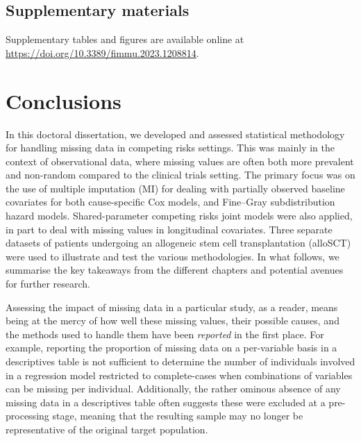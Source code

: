 \documentclass[
  letterpaper,
  paper=240mm:170mm,
  twoside=true,
  open=right,
  fontsize=10pt,
  pagesize=false,
  BCOR=15mm,
  DIV=14,
  headinclude=true,
  footinclude=false,
  headsepline=on]{scrbook}
\begin{document}
\section*{Supplementary materials}\label{supplementary-materials-5}


Supplementary tables and figures are available online at
\url{https://doi.org/10.3389/fimmu.2023.1208814}.


\chapter{Conclusions}\label{sec-chap-discussion}

In this doctoral dissertation, we developed and assessed statistical
methodology for handling missing data in competing risks settings. This
was mainly in the context of observational data, where missing values
are often both more prevalent and non-random compared to the clinical
trials setting. The primary focus was on the use of multiple imputation
(MI) for dealing with partially observed baseline covariates for both
cause-specific Cox models, and Fine--Gray subdistribution hazard models.
Shared-parameter competing risks joint models were also applied, in part
to deal with missing values in longitudinal covariates. Three separate
datasets of patients undergoing an allogeneic stem cell transplantation
(alloSCT) were used to illustrate and test the various methodologies. In
what follows, we summarise the key takeaways from the different chapters
and potential avenues for further research.

Assessing the impact of missing data in a particular study, as a reader,
means being at the mercy of how well these missing values, their
possible causes, and the methods used to handle them have been
\emph{reported} in the first place. For example, reporting the
proportion of missing data on a per-variable basis in a descriptives
table is not sufficient to determine the number of individuals involved
in a regression model restricted to complete-cases when combinations of
variables can be missing per individual. Additionally, the rather
ominous absence of any missing data in a descriptives table often
suggests these were excluded at a pre-processing stage, meaning that the
resulting sample may no longer be representative of the original target
population.
\end{document}
